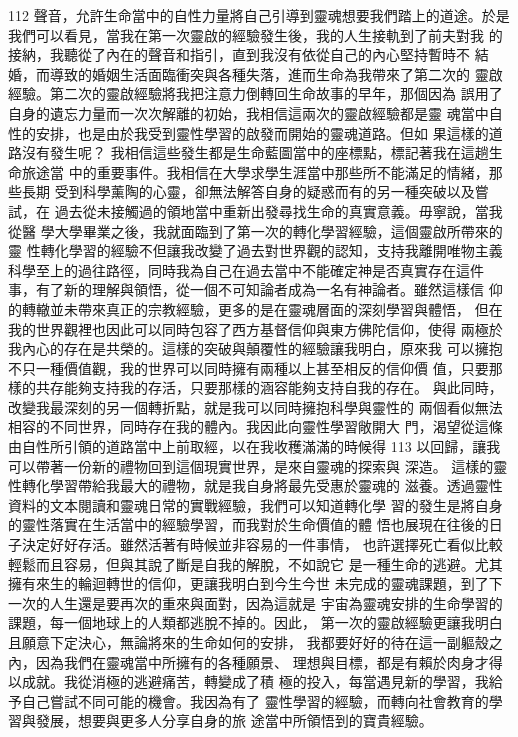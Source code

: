112 
聲音，允許生命當中的自性力量將自己引導到靈魂想要我們踏上的道途。於是
我們可以看見，當我在第一次靈啟的經驗發生後，我的人生接軌到了前夫對我
的接納，我聽從了內在的聲音和指引，直到我沒有依從自己的內心堅持暫時不
結婚，而導致的婚姻生活面臨衝突與各種失落，進而生命為我帶來了第二次的
靈啟經驗。第二次的靈啟經驗將我把注意力倒轉回生命故事的早年，那個因為
誤用了自身的遺忘力量而一次次解離的初始，我相信這兩次的靈啟經驗都是靈
魂當中自性的安排，也是由於我受到靈性學習的啟發而開始的靈魂道路。但如
果這樣的道路沒有發生呢？ 
我相信這些發生都是生命藍圖當中的座標點，標記著我在這趟生命旅途當
中的重要事件。我相信在大學求學生涯當中那些所不能滿足的情緒，那些長期
受到科學薰陶的心靈，卻無法解答自身的疑惑而有的另一種突破以及嘗試，在
過去從未接觸過的領地當中重新出發尋找生命的真實意義。毋寧說，當我從醫
學大學畢業之後，我就面臨到了第一次的轉化學習經驗，這個靈啟所帶來的靈
性轉化學習的經驗不但讓我改變了過去對世界觀的認知，支持我離開唯物主義
科學至上的過往路徑，同時我為自己在過去當中不能確定神是否真實存在這件
事，有了新的理解與領悟，從一個不可知論者成為一名有神論者。雖然這樣信
仰的轉轍並未帶來真正的宗教經驗，更多的是在靈魂層面的深刻學習與體悟，
但在我的世界觀裡也因此可以同時包容了西方基督信仰與東方佛陀信仰，使得
兩極於我內心的存在是共榮的。這樣的突破與顛覆性的經驗讓我明白，原來我
可以擁抱不只一種價值觀，我的世界可以同時擁有兩種以上甚至相反的信仰價
值，只要那樣的共存能夠支持我的存活，只要那樣的涵容能夠支持自我的存在。
與此同時，改變我最深刻的另一個轉折點，就是我可以同時擁抱科學與靈性的
兩個看似無法相容的不同世界，同時存在我的體內。我因此向靈性學習敞開大
門，渴望從這條由自性所引領的道路當中上前取經，以在我收穫滿滿的時候得
113 
以回歸，讓我可以帶著一份新的禮物回到這個現實世界，是來自靈魂的探索與
深造。 
這樣的靈性轉化學習帶給我最大的禮物，就是我自身將最先受惠於靈魂的
滋養。透過靈性資料的文本閱讀和靈魂日常的實戰經驗，我們可以知道轉化學
習的發生是將自身的靈性落實在生活當中的經驗學習，而我對於生命價值的體
悟也展現在往後的日子決定好好存活。雖然活著有時候並非容易的一件事情，
也許選擇死亡看似比較輕鬆而且容易，但與其說了斷是自我的解脫，不如說它
是一種生命的逃避。尤其擁有來生的輪迴轉世的信仰，更讓我明白到今生今世
未完成的靈魂課題，到了下一次的人生還是要再次的重來與面對，因為這就是
宇宙為靈魂安排的生命學習的課題，每一個地球上的人類都逃脫不掉的。因此，
第一次的靈啟經驗更讓我明白且願意下定決心，無論將來的生命如何的安排，
我都要好好的待在這一副軀殼之內，因為我們在靈魂當中所擁有的各種願景、
理想與目標，都是有賴於肉身才得以成就。我從消極的逃避痛苦，轉變成了積
極的投入，每當遇見新的學習，我給予自己嘗試不同可能的機會。我因為有了
靈性學習的經驗，而轉向社會教育的學習與發展，想要與更多人分享自身的旅
途當中所領悟到的寶貴經驗。 
